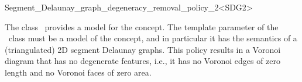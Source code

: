 

\begin{ccRefClass}{Segment_Delaunay_graph_degeneracy_removal_policy_2<SDG2>}


\ccDefinition

The class \ccRefName\ provides a model for the 
concept. The template parameter of the \ccRefName\ class must be a
model of the  concept, and in particular it has
the semantics of a (triangulated) 2D segment Delaunay graphs. This policy
results in a Voronoi diagram that has no degenerate features,
i.e., it has no Voronoi edges of zero length and no Voronoi faces of
zero area.



\ccIsModel
{}

\ccTypes
{}

\ccSeeAlso
{}\\
\\
\\
\\
\\
\end{ccRefClass}


